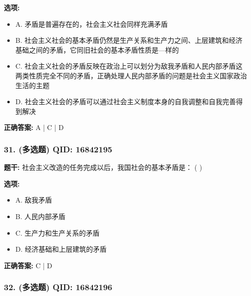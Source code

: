 \documentclass[12pt,UTF8]{ctexart}
\begin{document}
\textbf{选项:}
\begin{itemize}[leftmargin=*]

  \item A. 矛盾是普遍存在的，社会主义社会同样充满矛盾

  \item B. 社会主义社会的基本矛盾仍然是生产关系和生产力之间、上层建筑和经济基础之间的矛盾，它同旧社会的基本矛盾性质是—样的

  \item C. 社会主义社会的矛盾反映在政治上可以划分为敌我矛盾和人民内部矛盾这两类性质完全不同的矛盾，正确处理人民内部矛盾的问题是社会主义国家政治生活的主题

  \item D. 社会主义社会的矛盾可以通过社会主义制度本身的自我调整和自我完善得到解决

\end{itemize}

\textbf{正确答案:}
A | C | D

\vspace{0.3em}\hrulefill\vspace{0.7em}

\subsubsection*{31. (多选题) \small QID: 16842195}

\textbf{题干:}
社会主义改造的任务完成以后，我国社会的基本矛盾是： ( )

\textbf{选项:}
\begin{itemize}[leftmargin=*]

  \item A. 敌我矛盾

  \item B. 人民内部矛盾

  \item C. 生产力和生产关系的矛盾

  \item D. 经济基础和上层建筑的矛盾

\end{itemize}

\textbf{正确答案:}
C | D

\vspace{0.3em}\hrulefill\vspace{0.7em}

\subsubsection*{32. (多选题) \small QID: 16842196}
\end{document}
